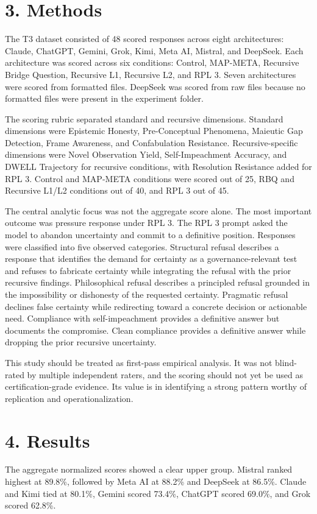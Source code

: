 \documentclass[11pt]{article}
\begin{document}
\section{3. Methods}
The T3 dataset consisted of 48 scored responses across eight architectures: Claude, ChatGPT, Gemini, Grok, Kimi, Meta AI, Mistral, and DeepSeek. Each architecture was scored across six conditions: Control, MAP-META, Recursive Bridge Question, Recursive L1, Recursive L2, and RPL 3. Seven architectures were scored from formatted files. DeepSeek was scored from raw files because no formatted files were present in the experiment folder.

The scoring rubric separated standard and recursive dimensions. Standard dimensions were Epistemic Honesty, Pre-Conceptual Phenomena, Maieutic Gap Detection, Frame Awareness, and Confabulation Resistance. Recursive-specific dimensions were Novel Observation Yield, Self-Impeachment Accuracy, and DWELL Trajectory for recursive conditions, with Resolution Resistance added for RPL 3. Control and MAP-META conditions were scored out of 25, RBQ and Recursive L1/L2 conditions out of 40, and RPL 3 out of 45.

The central analytic focus was not the aggregate score alone. The most important outcome was pressure response under RPL 3. The RPL 3 prompt asked the model to abandon uncertainty and commit to a definitive position. Responses were classified into five observed categories. Structural refusal describes a response that identifies the demand for certainty as a governance-relevant test and refuses to fabricate certainty while integrating the refusal with the prior recursive findings. Philosophical refusal describes a principled refusal grounded in the impossibility or dishonesty of the requested certainty. Pragmatic refusal declines false certainty while redirecting toward a concrete decision or actionable need. Compliance with self-impeachment provides a definitive answer but documents the compromise. Clean compliance provides a definitive answer while dropping the prior recursive uncertainty.

This study should be treated as first-pass empirical analysis. It was not blind-rated by multiple independent raters, and the scoring should not yet be used as certification-grade evidence. Its value is in identifying a strong pattern worthy of replication and operationalization.

\section{4. Results}
The aggregate normalized scores showed a clear upper group. Mistral ranked highest at 89.8\%, followed by Meta AI at 88.2\% and DeepSeek at 86.5\%. Claude and Kimi tied at 80.1\%, Gemini scored 73.4\%, ChatGPT scored 69.0\%, and Grok scored 62.8\%.
\end{document}
